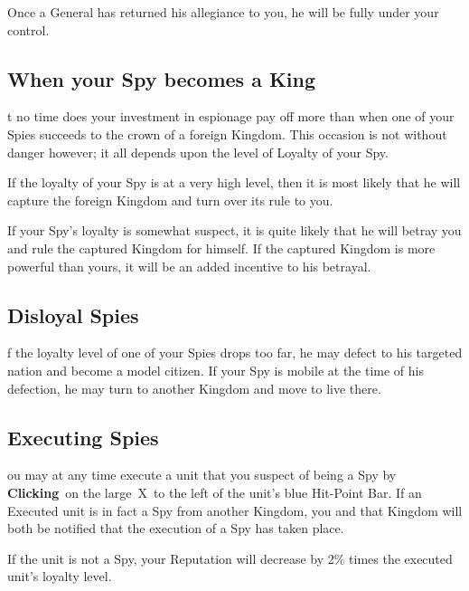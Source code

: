 Once a General has returned his allegiance to you, he will be fully under your control.

\subsection{When your Spy becomes a King}


t no time does your investment in espionage pay off more than when one of your Spies succeeds to the crown of a foreign Kingdom. This occasion is not without danger however; it all depends upon the level of Loyalty of your Spy.

If the loyalty of your Spy is at a very high level, then it is most likely that he will capture the foreign Kingdom and turn over its rule to you.

If your Spy’s loyalty is somewhat suspect, it is quite likely that he will betray you and rule the captured Kingdom for himself. If the captured Kingdom is more powerful than yours, it will be an added incentive to his betrayal.

\subsection{Disloyal Spies}


f the loyalty level of one of your Spies drops too far, he may defect to his targeted nation and become a model citizen. If your Spy is mobile at the time of his defection, he may turn to another Kingdom and move to live there.

\subsection{Executing Spies}


ou may at any time execute a unit that you suspect of being a Spy by \textbf{Clicking} on the large X to the left of the unit’s blue Hit-Point Bar. If an Executed unit is in fact a Spy from another Kingdom, you and that Kingdom will both be notified that the execution of a Spy has taken place.


If the unit is not a Spy, your Reputation will decrease by 2\% times the executed unit’s loyalty level.

